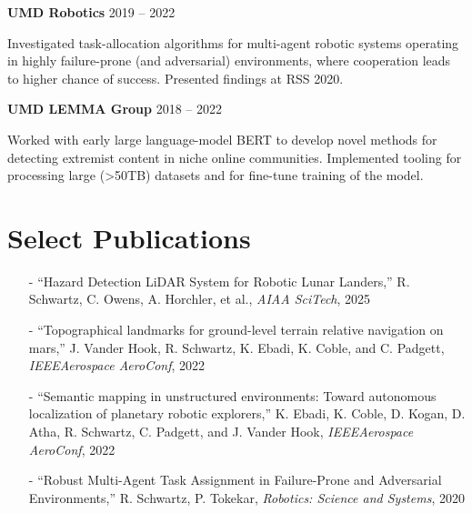 \documentclass[letterpaper,11pt]{article}
\begin{document}
\begin{minipage}[t]{0.42\textwidth}
  \noindent
  \textbf{UMD Robotics} \hspace{\fill} 2019 -- 2022

  \setlength{\parindent}{15pt}
  {\small Investigated task-allocation algorithms for multi-agent robotic systems operating in highly failure-prone (and adversarial) environments, where cooperation leads to higher chance of success. Presented findings at RSS 2020. }

  \vspace*{6pt}

  \noindent
  \textbf{UMD LEMMA Group} \hspace{\fill} 2018 -- 2022
    
  \setlength{\parindent}{15pt}
  {\small Worked with early large language-model BERT to develop novel methods for detecting extremist content in niche online communities. Implemented tooling for processing large (>50TB) datasets and for fine-tune training of the model. }
\end{minipage}


\section{Select Publications}
\small{
  \begin{itemize}
      \item[-] ``Hazard Detection LiDAR System for Robotic Lunar Landers,'' R. Schwartz, C. Owens, A. Horchler, et al., \textit{AIAA SciTech}, 2025

      \item[-] ``Topographical landmarks for ground-level terrain relative navigation on mars,'' J. Vander Hook, R. Schwartz, K. Ebadi, K. Coble, and C. Padgett, \textit{IEEEAerospace AeroConf}, 2022

      \item[-] ``Semantic  mapping in unstructured environments:  Toward autonomous localization of planetary robotic explorers,'' K. Ebadi, K. Coble, D. Kogan, D. Atha, R. Schwartz, C. Padgett, and J. Vander Hook, \textit{IEEEAerospace AeroConf}, 2022

      \item[-] ``Robust Multi-Agent Task Assignment in Failure-Prone and Adversarial Environments,'' R. Schwartz, P. Tokekar, \textit{Robotics: Science and Systems}, 2020
  \end{itemize} 
}
\end{document}
